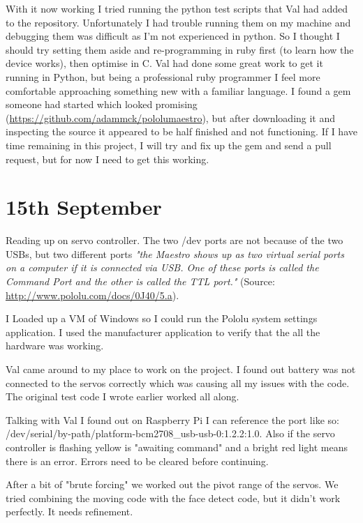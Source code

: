 With it now working I tried running the python test scripts that Val had added to the repository. Unfortunately I had trouble running them on my machine and debugging them was difficult as I'm not experienced in python. So I thought I should try setting them aside and re-programming in ruby first (to learn how the device works), then optimise in C. Val had done some great work to get it running in Python, but being a professional ruby programmer I feel more comfortable approaching something new with a familiar language. I found a gem someone had started which looked promising (\url{https://github.com/adammck/pololumaestro}), but after downloading it and inspecting the source it appeared to be half finished and not functioning. If I have time remaining in this project, I will try and fix up the gem and send a pull request, but for now I need to get this working.




\section*{15th September}


Reading up on servo controller. The two /dev ports are not because of the two USBs, but two different ports \textit{"the Maestro shows up as two virtual serial ports on a computer if it is connected via USB. One of these ports is called the Command Port and the other is called the TTL port."} (Source: \url{http://www.pololu.com/docs/0J40/5.a}).

I Loaded up a VM of Windows so I could run the Pololu system settings application. I used the manufacturer application to verify that the all the hardware was working.

Val came around to my place to work on the project. I found out battery was not connected to the servos correctly which was causing all my issues with the code. The original test code I wrote earlier worked all along.

Talking with Val I found out on Raspberry Pi I can reference the port like so: /dev/serial/by-path/platform-bcm2708\_usb-usb-0:1.2.2:1.0. Also if the servo controller is flashing yellow is "awaiting command" and a bright red light means there is an error. Errors need to be cleared before continuing.

After a bit of "brute forcing" we worked out the pivot range of the servos. We tried combining the moving code with the face detect code, but it didn't work perfectly. It needs refinement.

